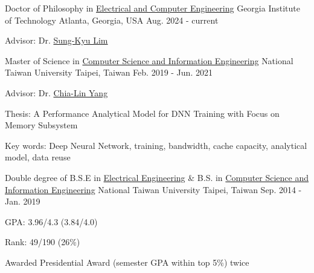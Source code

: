 

\begin{cventries}

  \cventry
    {Doctor of Philosophy in \underline{Electrical and Computer Engineering}}
    {Georgia Institute of Technology}
    {Atlanta, Georgia, USA}
    {Aug. 2024 - current}
    {
        \begin{cvitems}
        \item {Advisor: Dr. \href{https://limsk.ece.gatech.edu/}{Sung-Kyu Lim}}
        \end{cvitems}
    }

  \cventry
    {Master of Science in \underline{Computer Science and Information Engineering}}
    {National Taiwan University}
    {Taipei, Taiwan}
    {Feb. 2019 - Jun. 2021}
    {
        \begin{cvitems}
        \item {Advisor: Dr. \href{https://www.csie.ntu.edu.tw/~yangc/}{Chia-Lin Yang}}
        \item {Thesis: A Performance Analytical Model for DNN Training with Focus on Memory Subsystem}
        \item {Key words: Deep Neural Network, training, bandwidth, cache capacity, analytical model, data reuse}
        \end{cvitems}
    }
    
  \cventry
    {Double degree of B.S.E in \underline{Electrical Engineering} \& B.S. in \underline{Computer Science and Information Engineering}} %
    {National Taiwan University} %
    {Taipei, Taiwan} %
    {Sep. 2014 - Jan. 2019} %
    {
      \begin{cvitems} %
        \item {GPA: 3.96/4.3 (3.84/4.0)}
        \item {Rank: 49/190 (26\%)} 
        \item {Awarded Presidential Award (semester GPA within top 5\%) twice}
      \end{cvitems}
    }



\end{cventries}

